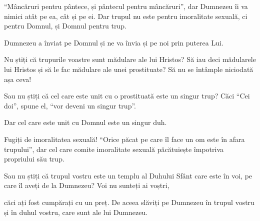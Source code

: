 {“Mâncăruri pentru pântece, și pântecul pentru mâncăruri”, dar Dumnezeu îi va nimici atât pe ea, cât și pe ei. Dar trupul nu este pentru imoralitate sexuală, ci pentru Domnul, și Domnul pentru trup.

Dumnezeu a înviat pe Domnul și ne va învia și pe noi prin puterea Lui.

Nu știți că trupurile voastre sunt mădulare ale lui Hristos? Să iau deci mădularele lui Hristos și să le fac mădulare ale unei prostituate? Să nu se întâmple niciodată așa ceva!

Sau nu știți că cel care este unit cu o prostituată este un singur trup? Căci “Cei doi”, spune el, “vor deveni un singur trup”.

Dar cel care este unit cu Domnul este un singur duh.

Fugiți de imoralitatea sexuală! “Orice păcat pe care îl face un om este în afara trupului”, dar cel care comite imoralitate sexuală păcătuiește împotriva propriului său trup.

Sau nu știți că trupul vostru este un templu al Duhului Sfânt care este în voi, pe care îl aveți de la Dumnezeu? Voi nu sunteți ai voștri,

căci ați fost cumpărați cu un preț. De aceea slăviți pe Dumnezeu în trupul vostru și în duhul vostru, care sunt ale lui Dumnezeu.



\par }

